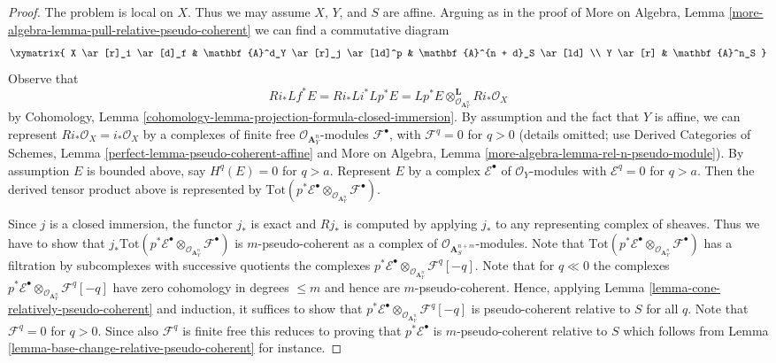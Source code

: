\begin{proof}
The problem is local on $X$. Thus we may assume $X$, $Y$, and $S$ are affine.
Arguing as in the proof of More on Algebra, Lemma
\ref{more-algebra-lemma-pull-relative-pseudo-coherent}
we can find a commutative diagram
$$
\xymatrix{
X \ar[r]_i \ar[d]_f &
\mathbf{A}^d_Y \ar[r]_j \ar[ld]^p &
\mathbf{A}^{n + d}_S \ar[ld] \\
Y \ar[r] &
\mathbf{A}^n_S
}
$$
Observe that
$$
Ri_* Lf^*E = Ri_* Li^* Lp^*E =
Lp^*E \otimes_{\mathcal{O}_{\mathbf{A}_Y^n}}^\mathbf{L} Ri_*\mathcal{O}_X
$$
by Cohomology, Lemma
\ref{cohomology-lemma-projection-formula-closed-immersion}.
By assumption and the fact that $Y$ is affine, we can represent
$Ri_*\mathcal{O}_X = i_*\mathcal{O}_X$ by a complexes of finite free
$\mathcal{O}_{\mathbf{A}_Y^n}$-modules $\mathcal{F}^\bullet$, with
$\mathcal{F}^q = 0$ for $q > 0$
(details omitted; use Derived Categories of Schemes, Lemma
\ref{perfect-lemma-pseudo-coherent-affine}
and
More on Algebra, Lemma
\ref{more-algebra-lemma-rel-n-pseudo-module}).
By assumption $E$ is bounded above, say $H^q(E) = 0$ for $q > a$.
Represent $E$ by a complex $\mathcal{E}^\bullet$ of $\mathcal{O}_Y$-modules
with $\mathcal{E}^q = 0$ for $q > a$. Then the derived tensor product above
is represented by $\text{Tot}(p^*\mathcal{E}^\bullet
\otimes_{\mathcal{O}_{\mathbf{A}_Y^n}} \mathcal{F}^\bullet)$.

\medskip\noindent
Since $j$ is a closed immersion, the functor $j_*$ is exact and
$Rj_*$ is computed by applying $j_*$ to any representing complex
of sheaves. Thus we have to show that
$j_*\text{Tot}(p^*\mathcal{E}^\bullet \otimes_{\mathcal{O}_{\mathbf{A}_Y^n}}
\mathcal{F}^\bullet)$ is $m$-pseudo-coherent
as a complex of $\mathcal{O}_{\mathbf{A}^{n + m}_S}$-modules.
Note that
$\text{Tot}(p^*\mathcal{E}^\bullet \otimes_{\mathcal{O}_{\mathbf{A}_Y^n}}
\mathcal{F}^\bullet)$ has a filtration by
subcomplexes with successive quotients the complexes
$p^*\mathcal{E}^\bullet
\otimes_{\mathcal{O}_{\mathbf{A}_Y^n}} \mathcal{F}^q[-q]$.
Note that for $q \ll 0$ the complexes
$p^*\mathcal{E}^\bullet \otimes_{\mathcal{O}_{\mathbf{A}_Y^n}}
\mathcal{F}^q[-q]$
have zero cohomology in degrees $\leq m$ and hence are $m$-pseudo-coherent.
Hence, applying
Lemma \ref{lemma-cone-relatively-pseudo-coherent}
and induction, it suffices to show that
$p^*\mathcal{E}^\bullet \otimes_{\mathcal{O}_{\mathbf{A}_Y^n}}
\mathcal{F}^q[-q]$
is pseudo-coherent relative to $S$ for all $q$. Note that $\mathcal{F}^q = 0$
for $q > 0$. Since also $\mathcal{F}^q$ is finite free this
reduces to proving that $p^*\mathcal{E}^\bullet$ is
$m$-pseudo-coherent relative to $S$ which follows from
Lemma \ref{lemma-base-change-relative-pseudo-coherent}
for instance.
\end{proof}

